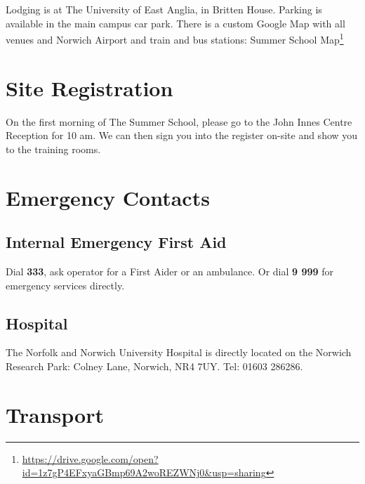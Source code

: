 \documentclass[12pt,]{book}
\let\rmarkdownfootnote\footnote%
\def\footnote{\protect\rmarkdownfootnote}
\renewcommand{\href}[2]{#2\footnote{\url{#1}}}
\theoremstyle{definition}
\theoremstyle{definition}
\theoremstyle{remark}
\begin{document}
Lodging is at The University of East Anglia, in Britten House. Parking
is available in the main campus car park. There is a custom Google Map
with all venues and Norwich Airport and train and bus stations:
\href{https://drive.google.com/open?id=1z7gP4EFxyaGBmp69A2woREZWNj0\&usp=sharing}{Summer
School Map}

\section*{Site Registration}\label{site-registration}

On the first morning of The Summer School, please go to the John Innes
Centre Reception for 10 am. We can then sign you into the register
on-site and show you to the training rooms.

\section*{Emergency Contacts}\label{emergency-contacts}

\subsection*{Internal Emergency First
Aid}\label{internal-emergency-first-aid}

Dial \textbf{333}, ask operator for a First Aider or an ambulance. Or
dial \textbf{9 999} for emergency services directly.

\subsection*{Hospital}\label{hospital}

The Norfolk and Norwich University Hospital is directly located on the
Norwich Research Park: Colney Lane, Norwich, NR4 7UY. Tel: 01603 286286.

\section*{Transport}\label{transport}
\end{document}
